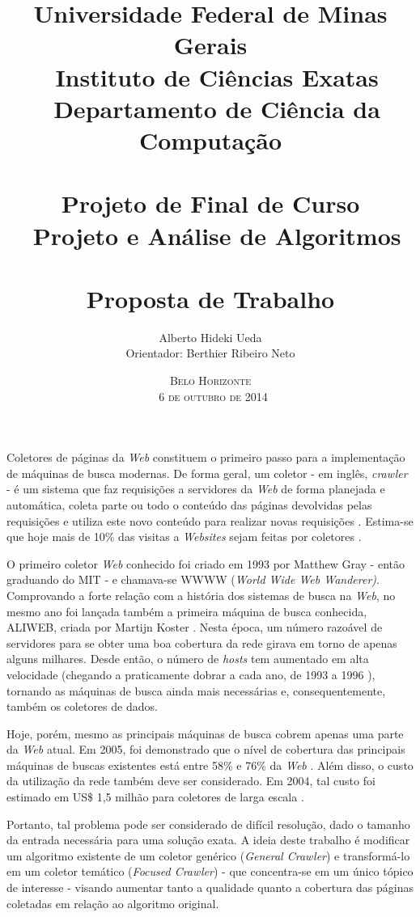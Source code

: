 \documentclass[a4paper,12pt,titlepage]{article}
\title{\large
Universidade Federal de Minas Gerais \\ \
Instituto de Ciências Exatas \\ \ 
Departamento de Ciência da Computação \\ \
\\[1cm]
Projeto de Final de Curso\\ \
Projeto e Análise de Algoritmos\\ \
\\[1cm]
\textbf{\Large Proposta de Trabalho }
\\[1cm]
}
\author{\large Alberto Hideki Ueda \\[0.5cm] 
	Orientador: Berthier Ribeiro Neto 
\\[3cm] }
\date{\textsc{Belo Horizonte\\ \
6 de outubro de 2014}}
\begin{document}
\maketitle

\pagebreak

Coletores de páginas da \textit{Web} constituem o primeiro passo para a implementação de máquinas de busca modernas. De forma geral, um coletor - em inglês, \textit{crawler} - é um sistema que faz requisições a servidores da \textit{Web} de forma planejada e automática, coleta parte ou todo o conteúdo das páginas devolvidas pelas requisições e utiliza este novo conteúdo para realizar novas requisições \cite{b}. Estima-se que hoje mais de 10\% das visitas a \textit{Websites} sejam feitas por coletores \cite{nielsen}.

O primeiro coletor \textit{Web} conhecido foi criado em 1993 por Matthew Gray - então graduando do MIT - e chamava-se WWWW (\textit{World Wide Web Wanderer)}. Comprovando a forte relação com a história dos sistemas de busca na \textit{Web}, no mesmo ano foi lançada também a primeira máquina de busca conhecida, ALIWEB, criada por Martijn Koster \cite{b}. Nesta época, um número razoável de servidores para se obter uma boa cobertura da rede girava em torno de apenas alguns milhares. Desde então, o número de \textit{hosts} tem aumentado em alta velocidade  (chegando a praticamente dobrar a cada ano, de 1993 a 1996 \cite{gray}), tornando as máquinas de busca ainda mais necessárias e, consequentemente, também os coletores de dados.

Hoje, porém, mesmo as principais máquinas de busca cobrem apenas uma parte da \textit{Web} atual. Em 2005, foi demonstrado que o nível de cobertura das principais máquinas de buscas existentes está entre 58\% e 76\% da \textit{Web} \cite{gulli}. Além disso, o custo da utilização da rede também deve ser considerado. Em 2004, tal custo foi estimado em US\$ 1,5 milhão para coletores de larga escala \cite{craswell}. 

Portanto, tal problema pode ser considerado de difícil resolução, dado o tamanho da entrada necessária para uma solução exata. A ideia deste trabalho é modificar um algoritmo existente de um coletor genérico (\textit{General Crawler}) e transformá-lo em um coletor temático (\textit{Focused Crawler}) - que concentra-se em um único tópico de interesse - visando aumentar tanto a qualidade quanto a cobertura das páginas coletadas em relação ao algoritmo original.
\end{document}
